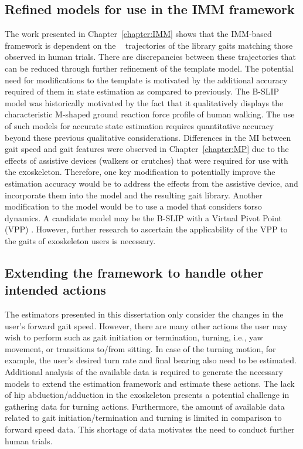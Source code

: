 \subsection{Refined models for use in the IMM framework}
The work presented in Chapter~\ref{chapter:IMM} shows that the IMM-based framework is dependent on the \com~ trajectories of the library gaits matching those observed in human trials. There are discrepancies between these trajectories that can be reduced through further refinement of the template model. The potential need for modifications to the template is motivated by the additional accuracy required of them in state estimation as compared to previously. The B-SLIP model was historically motivated by the fact that it qualitatively displays the characteristic M-shaped ground reaction force profile of human walking. The use of such models for accurate state estimation requires quantitative accuracy beyond these previous qualitative considerations. Differences in the MI between gait speed and gait features were observed in Chapter~\ref{chapter:MP} due to the effects of assistive devices (walkers or crutches) that were required for use with the exoskeleton. Therefore, one key modification to potentially improve the estimation accuracy would be to address the effects from the assistive device, and incorporate them into the model and the resulting gait library. Another modification to the model would be to use a model that considers torso dynamics. A candidate model may be the B-SLIP with a Virtual Pivot Point (VPP) \cite{maus2010upright}. However, further research to ascertain the applicability of the VPP to the gaits of exoskeleton users is necessary. 

\subsection{Extending the framework to handle other intended actions}

The estimators presented in this dissertation only consider the changes in the user's forward gait speed. However, there are many other actions the user may wish to perform such as gait initiation or termination, turning, i.e., yaw movement, or transitions to/from sitting. In case of the turning motion, for example, the user's desired turn rate and final bearing also need to be estimated. Additional analysis of the available data is required to generate the necessary models to extend the estimation framework and estimate these actions. The lack of hip abduction/adduction in the exoskeleton presents a potential challenge in gathering data for turning actions. Furthermore, the amount of available data related to gait initiation/termination and turning is limited in comparison to forward speed data. This shortage of data motivates the need to conduct further human trials.

